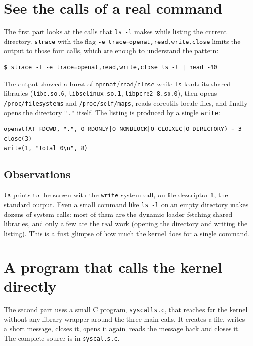 \documentclass[12pt,a4paper]{article}
\begin{document}
\section{See the calls of a real command}

The first part looks at the calls that \texttt{ls -l} makes while listing the current directory. \texttt{strace} with the flag \texttt{-e trace=openat,read,write,close} limits the output to those four calls, which are enough to understand the pattern:

\begin{lstlisting}
$ strace -f -e trace=openat,read,write,close ls -l | head -40
\end{lstlisting}

The output showed a burst of \texttt{openat}/\texttt{read}/\texttt{close} while \texttt{ls} loads its shared libraries (\texttt{libc.so.6}, \texttt{libselinux.so.1}, \texttt{libpcre2-8.so.0}), then opens \texttt{/proc/filesystems} and \texttt{/proc/self/maps}, reads coreutils locale files, and finally opens the directory \texttt{"."} itself. The listing is produced by a single \texttt{write}:

\begin{lstlisting}
openat(AT_FDCWD, ".", O_RDONLY|O_NONBLOCK|O_CLOEXEC|O_DIRECTORY) = 3
close(3)
write(1, "total 0\n", 8)
\end{lstlisting}

\subsection{Observations}

\texttt{ls} prints to the screen with the \texttt{write} system call, on file descriptor \textbf{1}, the standard output. Even a small command like \texttt{ls -l} on an empty directory makes dozens of system calls: most of them are the dynamic loader fetching shared libraries, and only a few are the real work (opening the directory and writing the listing). This is a first glimpse of how much the kernel does for a single command.

\section{A program that calls the kernel directly}

The second part uses a small C program, \texttt{syscalls.c}, that reaches for the kernel without any library wrapper around the three main calls. It creates a file, writes a short message, closes it, opens it again, reads the message back and closes it. The complete source is in \texttt{syscalls.c}.
\end{document}
